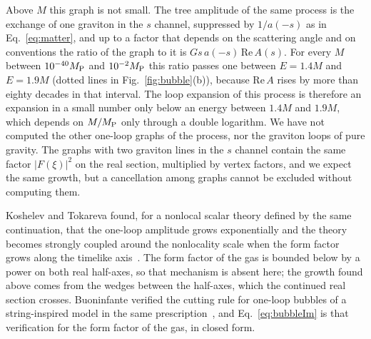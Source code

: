 \documentclass[a4paper,11pt]{article}
\begin{document}
Above $M$ this graph is not small. The tree amplitude of the same process is the exchange of one graviton in the $s$ channel, suppressed by $1/a(-s)$ as in Eq.~\eqref{eq:matter}, and up to a factor that depends on the scattering angle and on conventions the ratio of the graph to it is $Gs\,a(-s)\,\mathrm{Re}\,A(s)$. For every $M$ between $10^{-40}M_{\rm P}$ and $10^{-2}M_{\rm P}$ this ratio passes one between $E=1.4M$ and $E=1.9M$ (dotted lines in Fig.~\ref{fig:bubble}(b)), because $\mathrm{Re}\,A$ rises by more than eighty decades in that interval. The loop expansion of this process is therefore an expansion in a small number only below an energy between $1.4M$ and $1.9M$, which depends on $M/M_{\rm P}$ only through a double logarithm. We have not computed the other one-loop graphs of the process, nor the graviton loops of pure gravity. The graphs with two graviton lines in the $s$ channel contain the same factor $|F(\xi)|^2$ on the real section, multiplied by vertex factors, and we expect the same growth, but a cancellation among graphs cannot be excluded without computing them.

Koshelev and Tokareva found, for a nonlocal scalar theory defined by the same continuation, that the one-loop amplitude grows exponentially and the theory becomes strongly coupled around the nonlocality scale when the form factor grows along the timelike axis~\cite{KoshelevTokareva2021}. The form factor of the gas is bounded below by a power on both real half-axes, so that mechanism is absent here; the growth found above comes from the wedges between the half-axes, which the continued real section crosses. Buoninfante verified the cutting rule for one-loop bubbles of a string-inspired model in the same prescription~\cite{Buoninfante2022}, and Eq.~\eqref{eq:bubbleIm} is that verification for the form factor of the gas, in closed form.
\end{document}

